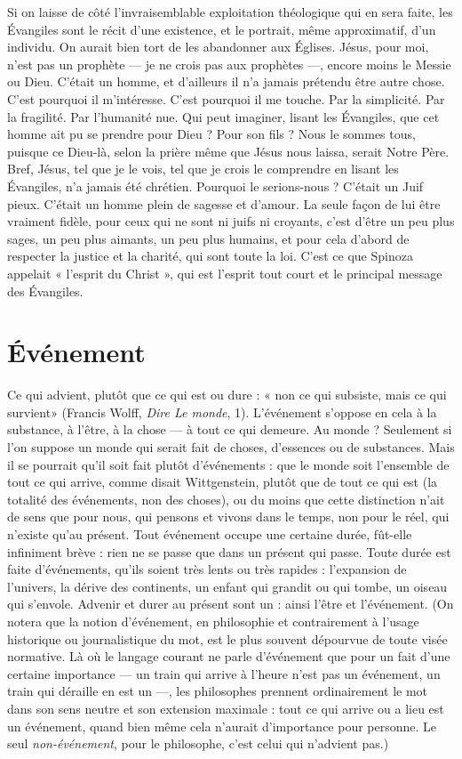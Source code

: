 Si on laisse de côté l’invraisemblable exploitation théologique qui en sera
faite, les Évangiles sont le récit d’une existence, et le portrait, même approximatif,
d’un individu. On aurait bien tort de les abandonner aux Églises. Jésus,
pour moi, n’est pas un prophète — je ne crois pas aux prophètes —, encore
moins le Messie ou Dieu. C'était un homme, et d’ailleurs il n’a jamais prétendu
être autre chose. C’est pourquoi il m'intéresse. C’est pourquoi il me touche.
Par la simplicité. Par la fragilité. Par l'humanité nue. Qui peut imaginer, lisant
les Évangiles, que cet homme ait pu se prendre pour Dieu ? Pour son fils ?
Nous le sommes tous, puisque ce Dieu-là, selon la prière même que Jésus nous
laissa, serait Notre Père. Bref, Jésus, tel que je le vois, tel que je crois le comprendre
en lisant les Évangiles, n’a jamais été chrétien. Pourquoi le serions-nous ?
C'était un Juif pieux. C’était un homme plein de sagesse et d’amour. La
seule façon de lui être vraiment fidèle, pour ceux qui ne sont ni juifs ni
croyants, c’est d’être un peu plus sages, un peu plus aimants, un peu plus
humains, et pour cela d’abord de respecter la justice et la charité, qui sont toute
la loi. C’est ce que Spinoza appelait « l'esprit du Christ », qui est l'esprit tout
court et le principal message des Évangiles.

\section{Événement}
Ce qui advient, plutôt que ce qui est ou dure : « non ce qui
subsiste, mais ce qui survient» (Francis Wolff, {\it Dire Le
monde}, 1). L'événement s'oppose en cela à la substance, à l'être, à la chose — à
tout ce qui demeure. Au monde ? Seulement si l’on suppose un monde qui
serait fait de choses, d’essences ou de substances. Mais il se pourrait qu’il soit
fait plutôt d’événements : que le monde soit l’ensemble de tout ce qui arrive,
comme disait Wittgenstein, plutôt que de tout ce qui est (la totalité des événements,
non des choses), ou du moins que cette distinction n’ait de sens que
pour nous, qui pensons et vivons dans le temps, non pour le réel, qui n’existe
qu’au présent. Tout événement occupe une certaine durée, fût-elle infiniment
brève : rien ne se passe que dans un présent qui passe. Toute durée est faite
d'événements, qu’ils soient très lents ou très rapides : l'expansion de l’univers,
la dérive des continents, un enfant qui grandit ou qui tombe, un oiseau qui
s'envole. Advenir et durer au présent sont un : ainsi l'être et l'événement.
(On notera que la notion d’événement, en philosophie et contrairement à
l'usage historique ou journalistique du mot, est le plus souvent dépourvue de
toute visée normative. Là où le langage courant ne parle d'événement que pour
un fait d’une certaine importance — un train qui arrive à l'heure n’est pas un
événement, un train qui déraille en est un —, les philosophes prennent ordinairement
le mot dans son sens neutre et son extension maximale : tout ce qui
arrive ou a lieu est un événement, quand bien même cela n’aurait d’importance
pour personne. Le seul {\it non-événement}, pour le philosophe, c’est celui qui
n’advient pas.)

